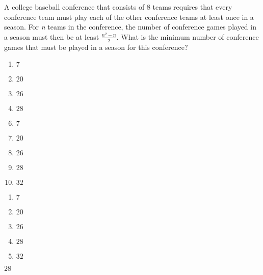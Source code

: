 A college baseball conference that consists of 8 teams requires that every conference team must play each of the other conference teams at least once in a season. For \textit{n} teams in the conference, the number of conference games played in a season must then be at least $\frac{\textit{n}^2-n}{2}$. What is the minimum number of conference games that must be played in a season for this conference?

\ifsat
	\begin{enumerate}[label=\Alph*)]
		\item   $7$
		\item  $20$ 
		\item  $26$ 
		\item  $28$ %
	\end{enumerate}
\else
\fi

\ifacteven
	\begin{enumerate}[label=\textbf{\Alph*.},itemsep=\fill,align=left]
		\setcounter{enumii}{5}
		\item   $7$
		\item  $20$ 
		\item  $26$ 
		\addtocounter{enumii}{1}
		\item  $28$ %
		\item  $32$ 
	\end{enumerate}
\else
\fi

\ifactodd
	\begin{enumerate}[label=\textbf{\Alph*.},itemsep=\fill,align=left]
		\item   $7$
		\item  $20$ 
		\item  $26$ 
		\item  $28$ %
		\item  $32$ 
	\end{enumerate}
\else
\fi

\ifgridin
  $28$ %

\else
\fi

